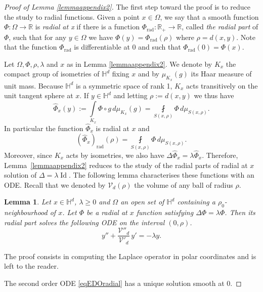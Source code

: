\documentclass[10pt]{amsart}
\let\mathcal\mathscr
\theoremstyle{plain}
\newtheorem{lemma}[equation]{Lemma}
\theoremstyle{definition}
\newcommand{\HH}{\mathbb{H}}
\newcommand{\RR}{\mathbb{R}}
\newcommand{\inte}[1]{\underset{#1}{\int}}
\newcommand{\finte}[3]{\underset{#1}{\fint} {#2} \, {#3}}
\DeclareMathOperator{\Id}{Id}
\begin{document}
\begin{proof}[Proof of Lemma \ref{lemmaappendix2}]
The first step toward the proof is to reduce the study to radial functions. Given a point $x \in \Omega$, we say that a smooth function $\Phi : \Omega \to \RR$ is \emph{radial at x} if there is a function $\Phi_{\mathrm{rad}} : \RR_+ \to \RR$, called \emph{the radial part} of $\Phi$, such that for any $y \in \Omega$ we have $\Phi(y) = \Phi_{\mathrm{rad}}(\rho)$ where $\rho = d(x,y)$. Note that the function $\Phi_{\mathrm{rad}}$ is differentiable at $0$ and such that $ \Phi_{\mathrm{rad}}(0) = \Phi(x)$.

Let $\Omega, \Phi, \rho, \lambda$ and $x$ as in Lemma \ref{lemmaappendix2}. We denote by $K_x$ the compact group of isometries of $\HH^d$ fixing $x$ and by $\mu_{K_x}(g)$ its Haar measure of unit mass. Because $\HH^d$ is a symmetric space of rank 1, $K_x$ acts transitively on the unit tangent sphere at $x$. If $y \in \HH^d$ and letting $\rho := d(x,y)$ we thus have
\[
\widehat{\Phi}_x(y) := \inte{K_x} \Phi \circ g \,d \mu_{K_x}(g) = \finte{S(x, \rho)}{\Phi}{ d \mu_{S(x,\rho)}}.
\]
In particular the function $\widehat{\Phi}_x$ is radial at $x$ and
\[
(\widehat{\Phi}_{x})_{\mathrm{rad}} (\rho) = \finte{S(x, \rho)}{\Phi}{ d \mu_{S(x,\rho)}}.
\]
Moreover, since $K_x$ acts by isometries, we also have $\Delta \widehat{\Phi}_x = \lambda \widehat{\Phi}_x$. Therefore, Lem\-ma~\ref{lemmaappendix2} reduces to the study of the radial parts of radial at $x$ solution of $\Delta = \lambda \Id$. The following lemma characterises these functions with an ODE. Recall that we denoted by $\mathcal{V}_d(\rho)$ the volume of any ball of radius $\rho$.

\begin{lemma}
\label{lemappendix1}
Let $x \in \HH^d$, $\lambda \ge 0$ and $\Omega$ an open set of $\HH^d$ containing a $\rho_0$\nobreakdash-neigh\-bourhood of $x$. Let $\Phi$ be a radial at $x$ function satisfying $\Delta \Phi = \lambda \Phi$. Then its radial part solves the following ODE on the interval $(0,\rho)$.
\begin{equation}
\label{eqEDOradial}
y'' + \frac{\mathcal{V}''_d}{\mathcal{V}'_d} \, y' = - \lambda y.
\end{equation}
\end{lemma}

The proof consists in computing the Laplace operator in polar coordinates and is left to the reader.

The second order ODE \eqref{eqEDOradial} has a unique solution smooth at $0$.


\end{proof}
\end{document}
